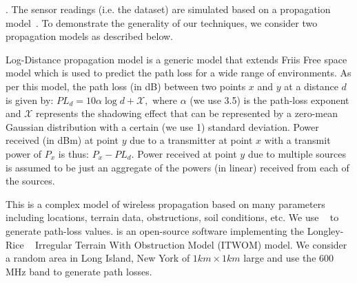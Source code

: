 
.
The sensor readings (i.e. the dataset) are simulated based on a propagation model~\cite{yuning2023}. 
To demonstrate the generality of our techniques, we consider two propagation models as described below. 

Log-Distance propagation model is a generic model that extends Friis Free space model 
which is used to predict the path loss for a wide range of environments. 
As per this model, the path loss (in dB) between 
two points $x$ and $y$ at a distance $d$ is given by: $PL_d = 10\alpha\log{d} + \mathcal{X},$
where $\alpha$ (we use 3.5) is the path-loss exponent and $\mathcal{X}$ represents the shadowing effect that can be represented by a zero-mean Gaussian distribution with a certain (we use 1) standard deviation. 
Power received (in dBm) at point $y$ due to a transmitter at point $x$ with a 
transmit power of $P_x$ is thus: $P_{x} - PL_d$.
Power received at point $y$ due to multiple sources is assumed to be just an 
aggregate  of the powers (in linear) received from each of the sources.


This is a complex model of wireless propagation based on many parameters including locations, terrain data, obstructions, soil conditions, etc.
We use \splat~\cite{splat} to generate path-loss values. \splat is an open-source software implementing the Longley-Rice ~\cite{chamberlin82} Irregular Terrain With Obstruction Model (ITWOM) model.
We consider a random area in Long Island, New York of $1km \times 1km$ large and use the 600 MHz band to generate path losses.



